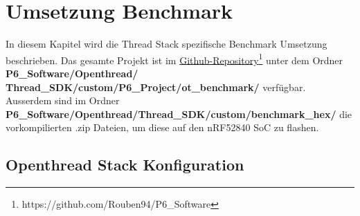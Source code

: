\clearpage
\section{Umsetzung Benchmark}\label{sec:ThreadUmsetzungBenchmark}
In diesem Kapitel wird die Thread Stack spezifische Benchmark Umsetzung beschrieben. Das gesamte Projekt ist im \href{https://github.com/Rouben94/P6_Software}{Github-Repository\footnote{\url{https://github.com/Rouben94/P6_Software}\cite{github_p6_software_p2p_2020}}} unter dem Ordner \textbf{P6\_Software/Openthread/ Thread\_SDK/custom/P6\_Project/ot\_benchmark/} verfügbar. Ausserdem sind im Ordner \textbf{P6\_Software/Openthread/Thread\_SDK/custom/benchmark\_hex/} die vorkompilierten .zip Dateien, um diese auf den nRF52840 SoC zu flashen. 

\subsection{Openthread Stack Konfiguration}\label{subsec:ThreadStackKonfiguration}
